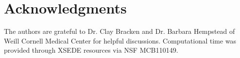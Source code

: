 \documentclass[journal=jacsat,manuscript=article]{achemso}
\begin{document}


\section*{Acknowledgments}
The authors are grateful to Dr. Clay Bracken and Dr. Barbara Hempstead of Weill Cornell Medical Center for helpful discussions. Computational time was provided through XSEDE resources via NSF MCB110149. 


\newpage



%
\end{document}
